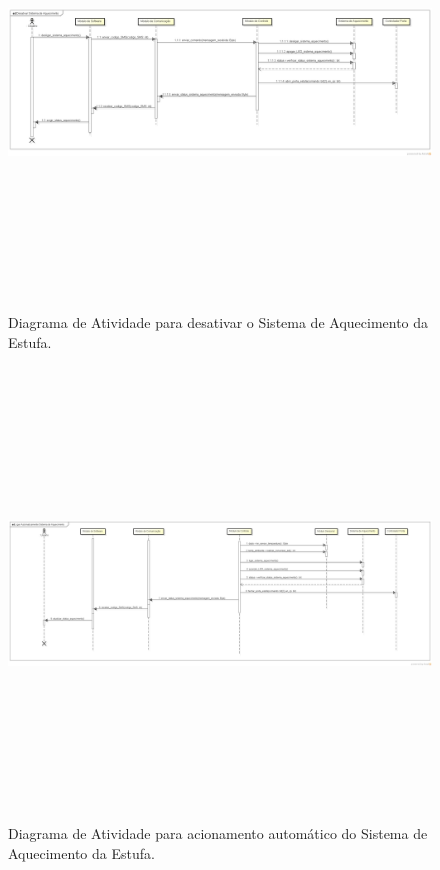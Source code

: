 \documentclass{report}
\begin{document}
	\begin{landscape}
	    \begin{figure}[H]
	      \includegraphics[width=\linewidth, height = 12cm]{pictures/desativar_aquecimento.png}
	      \caption{Diagrama de Atividade para desativar o Sistema de Aquecimento da Estufa.}
	      \label{figure:desativar_aquecimento}
	      \end{figure}
	\end{landscape}
	\begin{landscape}
	      \begin{figure}[H]
		  \includegraphics[width=\linewidth, height = 12cm]{pictures/ligar_automaticamente_sistema_aquecimento.png}
		  \caption{Diagrama de Atividade para acionamento automático do Sistema de Aquecimento da Estufa.}
		  \label{figure:ligar_automaticamente_sistema_aquecimento}
	      \end{figure}
	\end{landscape}
	
\end{document}

